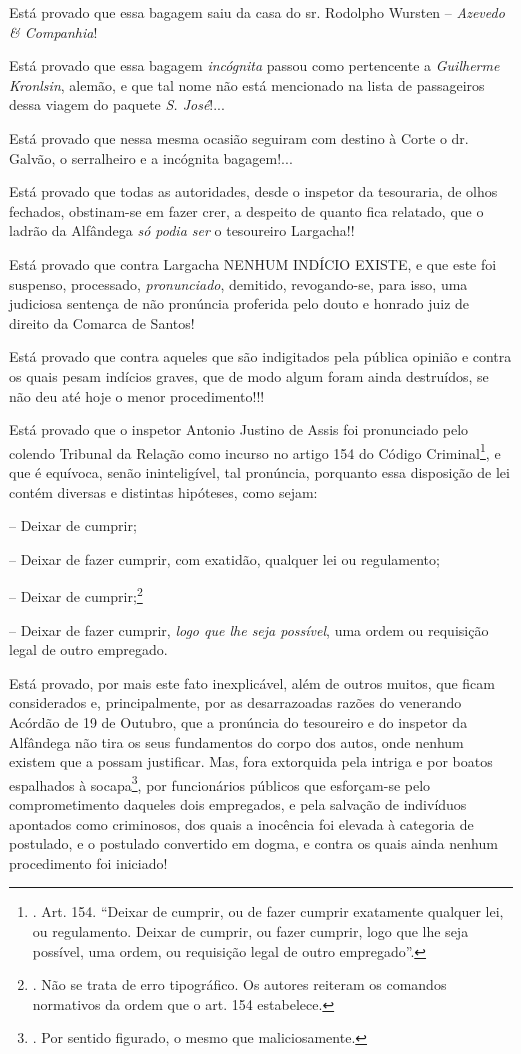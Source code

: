 Está provado que essa bagagem saiu da casa do sr. Rodolpho Wursten --
\emph{Azevedo \& Companhia}!

Está provado que essa bagagem \emph{incógnita} passou como pertencente a
\emph{Guilherme Kronlsin}, alemão, e que tal nome não está mencionado na
lista de passageiros dessa viagem do paquete \emph{S. José}!...

Está provado que nessa mesma ocasião seguiram com destino à Corte o dr.
Galvão, o serralheiro e a incógnita bagagem!...

Está provado que todas as autoridades, desde o inspetor da tesouraria,
de olhos fechados, obstinam-se em fazer crer, a despeito de quanto fica
relatado, que o ladrão da Alfândega \emph{só podia ser} o tesoureiro
Largacha!!

Está provado que contra Largacha NENHUM INDÍCIO EXISTE, e que este foi
suspenso, processado, \emph{pronunciado}, demitido, revogando-se, para
isso, uma judiciosa sentença de não pronúncia proferida pelo douto e
honrado juiz de direito da Comarca de Santos!

Está provado que contra aqueles que são indigitados pela pública opinião
e contra os quais pesam indícios graves, que de modo algum foram ainda
destruídos, se não deu até hoje o menor procedimento!!!

Está provado que o inspetor Antonio Justino de Assis foi pronunciado
pelo colendo Tribunal da Relação como incurso no artigo 154 do Código
Criminal\footnote{. Art. 154. ``Deixar de cumprir, ou de fazer cumprir
  exatamente qualquer lei, ou regulamento. Deixar de cumprir, ou fazer
  cumprir, logo que lhe seja possível, uma ordem, ou requisição legal de
  outro empregado''.}, e que é equívoca, senão ininteligível, tal
pronúncia, porquanto essa disposição de lei contém diversas e distintas
hipóteses, como sejam:

-- Deixar de cumprir;

-- Deixar de fazer cumprir, com exatidão, qualquer lei ou regulamento;

-- Deixar de cumprir;\footnote{. Não se trata de erro tipográfico. Os
  autores reiteram os comandos normativos da ordem que o art. 154
  estabelece.}

-- Deixar de fazer cumprir, \emph{logo que lhe seja possível}, uma ordem
ou requisição legal de outro empregado.

Está provado, por mais este fato inexplicável, além de outros muitos,
que ficam considerados e, principalmente, por as desarrazoadas razões do
venerando Acórdão de 19 de Outubro, que a pronúncia do tesoureiro e do
inspetor da Alfândega não tira os seus fundamentos do corpo dos autos,
onde nenhum existem que a possam justificar. Mas, fora extorquida pela
intriga e por boatos espalhados à socapa\footnote{. Por sentido
  figurado, o mesmo que maliciosamente.}, por funcionários públicos que
esforçam-se pelo comprometimento daqueles dois empregados, e pela
salvação de indivíduos apontados como criminosos, dos quais a inocência
foi elevada à categoria de postulado, e o postulado convertido em dogma,
e contra os quais ainda nenhum procedimento foi iniciado!

